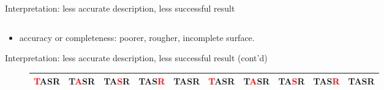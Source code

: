 \documentclass[10pt]{beamer}
\newcommand{\tc}[1]{\textcolor{red}{#1}}
\begin{document}
\begin{frame}{Interpretation: less accurate description, less successful result}
\begin{figure}
\begin{tabular}{*{5}{c}|*{5}{c}}
\end{tabular}
\end{figure}
\addtolength{\tabcolsep}{6pt}

\begin{exampleblock}{}
\begin{itemize}
\item accuracy or completeness: poorer, rougher, incomplete surface.
\end{itemize}
\end{exampleblock}

\end{frame}

\begin{frame}{Interpretation: less accurate description, less successful result (cont'd)}

\addtolength{\tabcolsep}{-6pt}
\begin{figure}
\centering
\begin{tabular}{*{5}{c}|*{5}{c}}
\tc{T}ASR & T\tc{A}SR & TA\tc{S}R & TAS\tc{R} & TASR & \tc{T}ASR & T\tc{A}SR & TA\tc{S}R & TAS\tc{R} & TASR\\
\midrule


\end{tabular}
\end{figure}
\end{frame}
\end{document}
